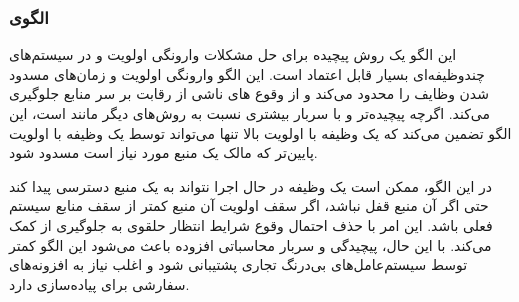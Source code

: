 \subsubsection{الگوی }
\label{resourcePriorCeilSec}
\begin{RTL}
این الگو \cite{ref4}
یک روش پیچیده برای حل مشکلات وارونگی اولویت
و  در سیستم‌های چندوظیفه‌ای بسیار قابل اعتماد است.
این الگو وارونگی اولویت و زمان‌های مسدود شدن وظایف را محدود می‌کند
و از وقوع های ناشی از رقابت بر سر منابع جلوگیری می‌کند.
اگرچه پیچیده‌تر و با سربار بیشتری نسبت به روش‌های دیگر مانند
 است، این الگو تضمین می‌کند
که یک وظیفه با اولویت بالا تنها می‌تواند توسط یک وظیفه با اولویت پایین‌تر
که مالک یک منبع مورد نیاز است مسدود شود.
\end{RTL}
\begin{RTL}
در این الگو، ممکن است یک وظیفه در حال اجرا نتواند
به یک منبع دسترسی پیدا کند حتی اگر آن منبع قفل نباشد،
اگر سقف اولویت آن منبع کمتر از سقف منابع سیستم فعلی باشد.
این امر با حذف احتمال وقوع شرایط انتظار حلقوی
به جلوگیری از  کمک می‌کند.
با این حال، پیچیدگی و سربار محاسباتی افزوده باعث می‌شود این الگو کمتر توسط
سیستم‌عامل‌های بی‌درنگ تجاری پشتیبانی شود
و اغلب نیاز به افزونه‌های سفارشی برای پیاده‌سازی دارد.
\end{RTL}